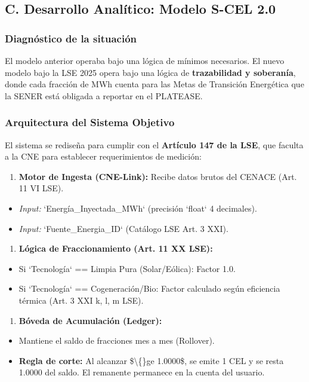 \documentclass{cel}
\begin{document}
\subsection{C. Desarrollo Analítico: Modelo S-CEL 2.0}
\nopagebreak

\subsubsection{Diagnóstico de la situación}
\nopagebreak

El modelo anterior operaba bajo una lógica de \textquotedbl{}mínimos necesarios\textquotedbl{}. El nuevo modelo bajo la LSE 2025 opera bajo una lógica de \textbf{trazabilidad y soberanía}, donde cada fracción de MWh cuenta para las Metas de Transición Energética que la SENER está obligada a reportar en el PLATEASE.


\subsubsection{Arquitectura del Sistema Objetivo}
\nopagebreak

El sistema se rediseña para cumplir con el \textbf{Artículo 147 de la LSE}, que faculta a la CNE para establecer requerimientos de medición:


\begin{enumerate}
\item \textbf{Motor de Ingesta (CNE-Link):} Recibe datos brutos del CENACE (Art. 11 VI LSE).
\end{enumerate}
\begin{itemize}
\item \textit{Input:} `Energía\_Inyectada\_MWh` (precisión `float` 4 decimales).
\item \textit{Input:} `Fuente\_Energia\_ID` (Catálogo LSE Art. 3 XXI).
\end{itemize}
\begin{enumerate}
\item \textbf{Lógica de Fraccionamiento (Art. 11 XX LSE):}
\end{enumerate}
\begin{itemize}
\item Si `Tecnología` == \textquotedbl{}Limpia Pura\textquotedbl{} (Solar/Eólica): Factor 1.0.
\item Si `Tecnología` == \textquotedbl{}Cogeneración/Bio\textquotedbl{}: Factor calculado según eficiencia térmica (Art. 3 XXI k, l, m LSE).
\end{itemize}
\begin{enumerate}
\item \textbf{Bóveda de Acumulación (Ledger):}
\end{enumerate}
\begin{itemize}
\item Mantiene el saldo de fracciones mes a mes (\textquotedbl{}Rollover\textquotedbl{}).
\item \textbf{Regla de corte:} Al alcanzar \$\textbackslash\{\}ge 1.0000\$, se emite 1 CEL y se resta 1.0000 del saldo. El remanente permanece en la cuenta del usuario.

\end{itemize}
\vspace{0.4cm}
\end{document}
